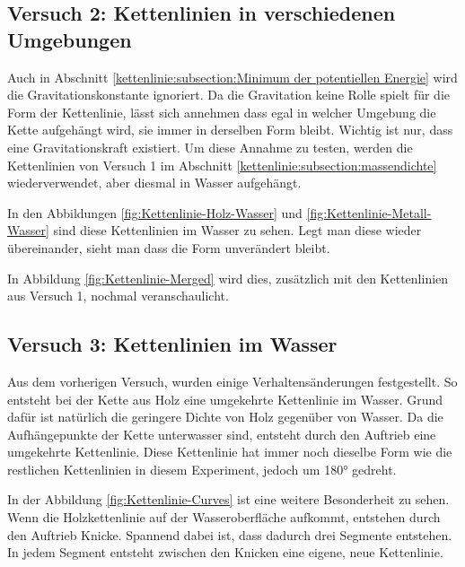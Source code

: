 \subsection{Versuch 2: Kettenlinien in verschiedenen Umgebungen
\label{kettenlinie:subsection:umgebung}}
Auch in Abschnitt \ref{kettenlinie:subsection:Minimum der potentiellen Energie} wird die Gravitationskonstante ignoriert.
Da die Gravitation keine Rolle spielt für die Form der Kettenlinie, lässt sich annehmen dass egal in welcher Umgebung die Kette aufgehängt wird, sie immer in derselben Form bleibt.
Wichtig ist nur, dass eine Gravitationskraft existiert.
Um diese Annahme zu testen, werden die Kettenlinien von Versuch 1 im Abschnitt \ref{kettenlinie:subsection:massendichte} wiederverwendet, aber diesmal in Wasser aufgehängt.

In den Abbildungen \ref{fig:Kettenlinie-Holz-Wasser} und \ref{fig:Kettenlinie-Metall-Wasser} sind diese Kettenlinien im Wasser zu sehen.
Legt man diese wieder übereinander, sieht man dass die Form unverändert bleibt.

In Abbildung \ref{fig:Kettenlinie-Merged} wird dies, zusätzlich mit den Kettenlinien aus Versuch 1, nochmal veranschaulicht.

\subsection{Versuch 3: Kettenlinien im Wasser
\label{kettenlinie:subsection:wasser}}

Aus dem vorherigen Versuch, wurden einige Verhaltensänderungen festgestellt.
So entsteht bei der Kette aus Holz eine umgekehrte Kettenlinie im Wasser.
Grund dafür ist natürlich die geringere Dichte von Holz gegenüber von Wasser.
Da die Aufhängepunkte der Kette unterwasser sind, entsteht durch den Auftrieb eine umgekehrte Kettenlinie.
Diese Kettenlinie hat immer noch dieselbe Form wie die restlichen Kettenlinien in diesem Experiment, jedoch um 180° gedreht.

In der Abbildung \ref{fig:Kettenlinie-Curves} ist eine weitere Besonderheit zu sehen.
Wenn die Holzkettenlinie auf der Wasseroberfläche aufkommt, entstehen durch den Auftrieb Knicke.
Spannend dabei ist, dass dadurch drei Segmente entstehen.
In jedem Segment entsteht zwischen den Knicken eine eigene, neue Kettenlinie.

